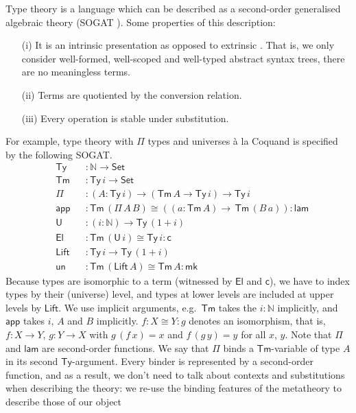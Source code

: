 \documentclass[sigplan,10pt,anonymous,review]{acmart}\settopmatter{printfolios=true,printccs=false,printacmref=false}
\newcommand{\ra}{\rightarrow}
\newcommand{\Set}{\mathsf{Set}}
\newcommand{\Ty}{\mathsf{Ty}}
\newcommand{\Tm}{\mathsf{Tm}}
\newcommand{\N}{\mathbb{N}}
\newcommand{\lam}{\mathsf{lam}}
\newcommand{\app}{\mathsf{app}}
\newcommand{\U}{\mathsf{U}}
\newcommand{\El}{\mathsf{El}}
\newcommand{\cd}{\mathsf{c}}
\newcommand{\Lift}{\mathsf{Lift}}
\newcommand{\mk}{\mathsf{mk}}
\newcommand{\un}{\mathsf{un}}
\begin{document}
Type theory is a language which can be described as a second-order
generalised algebraic theory (SOGAT
\cite{DBLP:conf/fscd/KaposiX24}). Some properties of this description:
\begin{enumerate}
\item[(i)] It is an intrinsic presentation
  \cite{DBLP:conf/csl/AltenkirchR99,DBLP:conf/popl/AltenkirchK16} as
  opposed to extrinsic \cite{abel2013normalization,theo}. That is, we
  only consider well-formed, well-scoped and well-typed abstract
  syntax trees, there are no meaningless terms.
\item[(ii)] Terms are quotiented by the conversion relation.
\item[(iii)] Every operation is stable under substitution.
\end{enumerate}
For example, type theory with $\Pi$ types and universes {\`a} la
Coquand \cite{coquandUniverse} is specified by the following SOGAT.
\begin{equation}\label{eq:tt}
\begin{alignedat}{10}
  & \Ty && : \N\ra\Set \\
  & \Tm && : \Ty\,i\ra\Set \\
  & \Pi && : (A:\Ty\,i)\ra(\Tm\,A\ra\Ty\,i)\ra\Ty\,i \\
  & \app && : \Tm\,(\Pi\,A\,B)\cong((a:\Tm\,A)\ra\,\Tm\,(B\,a)): \lam \\
  & \U && : (i:\N)\ra\Ty\,(1+i) \\
  & \El && : \Tm\,(\U\,i)\cong\Ty\,i : \cd \\
  & \Lift && : \Ty\,i\ra\Ty\,(1+i) \\
  & \un && : \Tm\,(\Lift\,A)\cong\Tm\,A : \mk
\end{alignedat}
\end{equation}
Because types are isomorphic to a term (witnessed by $\El$ and $\cd$),
we have to index types by their (universe) level, and types at lower
levels are included at upper levels by $\Lift$. We use implicit
arguments, e.g.\ $\Tm$ takes the $i:\N$ implicitly, and $\app$ takes
$i$, $A$ and $B$ implicitly. $f : X \cong Y : g$ denotes an
isomorphism, that is, $f : X\ra Y$, $g:Y\ra X$ with $g\,(f\,x) = x$
and $f\,(g\,y) = y$ for all $x$, $y$. Note that $\Pi$ and $\lam$ are
second-order functions. We say that $\Pi$ binds a $\Tm$-variable of
type $A$ in its second $\Ty$-argument. Every binder is represented by
a second-order function, and as a result, we don't need to talk about
contexts and substitutions when describing the theory: we re-use the
binding features of the metatheory to describe those of our object
\end{document}
